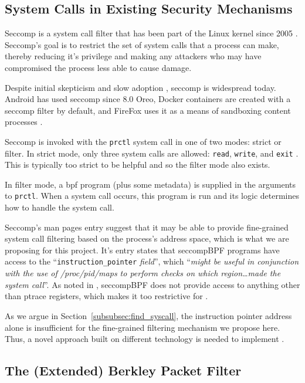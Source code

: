 \subsection{System Calls in Existing Security Mechanisms}

Seccomp is a system call filter that has been part of the Linux kernel since
2005 \cite{arcangeli_seccomp_2005}. Seccomp's goal is to restrict the set of
system calls that a process can make, thereby reducing it's privilege and making
any attackers who may have compromised the process less able to cause damage.

Despite initial skepticism and slow adoption
\cite{TORVALDS_ANYONE_USES_SECCOMP}, seccomp is widespread today. Android has
used seccomp since 8.0 Oreo, Docker containers are
created with a seccomp filter by default, and FireFox uses it as a means of
sandboxing content processes \cite{android_seccomp_oreo, docker_seccomp,
firefox_seccomp}.

Seccomp is invoked with the \texttt{prctl} system call in one of two modes: strict
or filter. In strict mode, only three system calls are allowed: \texttt{read},
\texttt{write}, and \texttt{exit} \cite{MAN_PAGES_SECCOMP}. This is typically
too strict to be helpful and so the filter mode also exists.

In filter mode, a \ac{bpf} program (plus some metadata) is supplied in the arguments to
\texttt{prctl}. When a system call occurs, this program is run and its logic
determines how to handle the system call. 

Seccomp's man pages entry suggest that it may be able to provide fine-grained
system call filtering based on the process's address space, which is what we
are proposing for this project. It's entry states that seccompBPF programs have
access to the ``\texttt{instruction\_pointer} \textit{field}'', which
``\textit{might be useful in conjunction with the use of /proc/pid/maps to
perform checks on which region\dots made the system call}''. As noted in
\textcite{yang2024makingsyscallprivilegeright}, seccompBPF does not provide
access to anything other than ptrace registers, which makes it too restrictive
for \af.

As we argue in Section~\ref{subsubsec:find_syscall}, the instruction pointer
address alone is insufficient for the fine-grained filtering mechanism we
propose here. Thus, a novel approach built on different technology is needed
to implement \af. 

\subsection{The (Extended) Berkley Packet Filter}\label{subsec:bgd-bpf}

